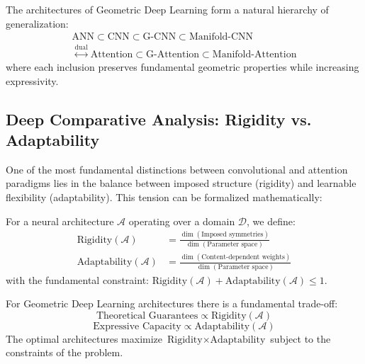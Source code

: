 \begin{remark}\label{rem:jerarquia_generalizacion}
The architectures of Geometric Deep Learning form a natural hierarchy of generalization:
\begin{multline}
\text{ANN} \subset \text{CNN} \subset \text{G-CNN} \subset \text{Manifold-CNN} \\
\stackrel{\text{dual}}{\leftrightarrow} \text{Attention} \subset \text{G-Attention} \subset \text{Manifold-Attention}
\end{multline}
where each inclusion preserves fundamental geometric properties while increasing expressivity.
\end{remark}

\subsection{Deep Comparative Analysis: Rigidity vs. Adaptability}\label{subsec:rigidez_adaptabilidad}

One of the most fundamental distinctions between convolutional and attention paradigms lies in the balance between imposed structure (rigidity) and learnable flexibility (adaptability). This tension can be formalized mathematically:

\begin{definition}\label{def:espectro_rigidez_adaptabilidad}
For a neural architecture $\mathcal{A}$ operating over a domain $\mathcal{D}$, we define:
\begin{align}
    \text{Rigidity}(\mathcal{A}) &= \frac{\dim(\text{Imposed symmetries})}{\dim(\text{Parameter space})} \\
    \text{Adaptability}(\mathcal{A}) &= \frac{\dim(\text{Content-dependent weights})}{\dim(\text{Parameter space})}
\end{align}
with the fundamental constraint: $\text{Rigidity}(\mathcal{A}) + \text{Adaptability}(\mathcal{A}) \leq 1$.
\end{definition}

\begin{remark}\label{rem:tradeoff_rigidez_adaptabilidad}
For Geometric Deep Learning architectures there is a fundamental trade-off:
\begin{equation}
    \text{Theoretical Guarantees} \propto \text{Rigidity}(\mathcal{A})
\end{equation}
\begin{equation}
    \text{Expressive Capacity} \propto \text{Adaptability}(\mathcal{A})
\end{equation}
The optimal architectures maximize $\text{Rigidity} \times \text{Adaptability}$ subject to the constraints of the problem.
\end{remark}

